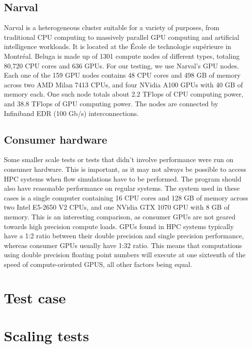 \subsection{Narval} \label{section:results:platforms:narval}
Narval is a heterogeneous cluster suitable for a variety of purposes, from traditional CPU computing
to massively parallel GPU computing and artificial intelligence workloads. It is located at the
École de technologie supérieure in Montréal. Beluga is made up of 1301 compute nodes of different
types, totaling 80,720 CPU cores and 636 GPUs. For our testing, we use Narval's GPU nodes. Each one
of the 159 GPU nodes contains 48 CPU cores and 498 GB of memory across two AMD Milan 7413 CPUs, and
four NVidia A100 GPUs with 40 GB of memory each. One such node totals about 2.2 TFlops of CPU
computing power, and 38.8 TFlops of GPU computing power. The nodes are connected by Infiniband EDR
(100 Gb/s) interconnections.

\subsection{Consumer hardware} \label{section:results:platforms:consumer}
Some smaller scale tests or tests that didn't involve performance were run on consumer hardware.
This is important, as it may not always be possible to access HPC systems when flow simulations have
to be performed. The program should also have reasonable performance on regular systems. The system
used in these cases is a single computer containing 16 CPU cores and 128 GB of memory across two
Intel E5-2650 V2 CPUs, and one NVidia GTX 1070 GPU with 8 GB of memory. This is an interesting
comparison, as consumer GPUs are not geared towards high precision compute loads. GPUs found in HPC
systems typically have a 1:2 ratio between their double precision and single precision performance,
whereas consumer GPUs usually have 1:32 ratio. This means that computations using double precision
floating point numbers will execute at one sixteenth of the speed of compute-oriented GPUS, all
other factors being equal.

\section{Test case} \label{section:results:test_case}

\section{Scaling tests} \label{section:results:scaling_tests}

